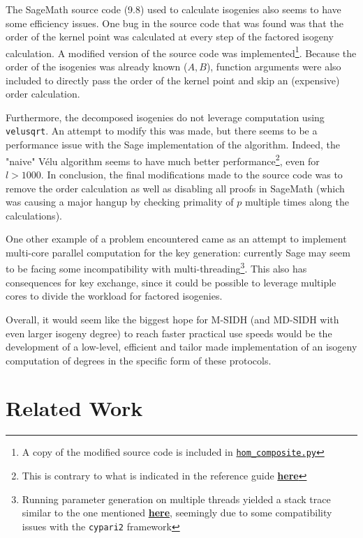 \documentclass[a4paper,11pt,oneside]{report}
\begin{document}
    The SageMath source code (9.8) used to calculate isogenies also seems to have some efficiency issues. One bug in the source code that was found was that the order of the kernel point was calculated at every step of the factored isogeny calculation. A modified version of the source code was implemented\footnote{A copy of the modified source code is included in \href{https://github.com/mrztti/lasec-MSIDH/blob/main/hom\_composite.py}{\texttt{hom\_composite.py}}}. Because the order of the isogenies was already known ($A,B$), function arguments were also included to directly pass the order of the kernel point and skip an (expensive) order calculation.
    
    Furthermore, the decomposed isogenies do not leverage computation using \texttt{velusqrt}. An attempt to modify this was made, but there seems to be a performance issue with the Sage implementation of the algorithm. Indeed, the "naive" Vélu algorithm seems to have much better performance\footnote{This is contrary to what is indicated in the reference guide \textbf{\href{https://doc.sagemath.org/html/en/reference/arithmetic_curves/sage/schemes/elliptic\_curves/hom_velusqrt.html}{here}}}, even for $l > 1000$. 
    In conclusion, the final modifications made to the source code was to remove the order calculation as well as disabling all proofs in SageMath (which was causing a major hangup by checking primality of $p$ multiple times along the calculations).
    
    One other example of a problem encountered came as an attempt to implement multi-core parallel computation for the key generation: currently Sage may seem to be facing some incompatibility with multi-threading\footnote{Running parameter generation on multiple threads yielded a stack trace similar to the one mentioned 
    \textbf{\href{https://github.com/sagemath/cypari2/issues/107}{here}}, seemingly due to some compatibility issues with the \texttt{cypari2} framework
    }. This also has consequences for key exchange, since it could be possible to leverage multiple cores to divide the workload for factored isogenies.
    
    Overall, it would seem like the biggest hope for M-SIDH (and MD-SIDH with even larger isogeny degree) to reach faster practical use speeds would be the development of a low-level, efficient and tailor made implementation of an isogeny computation of degrees in the specific form of these protocols.

\chapter{Related Work}
\end{document}
